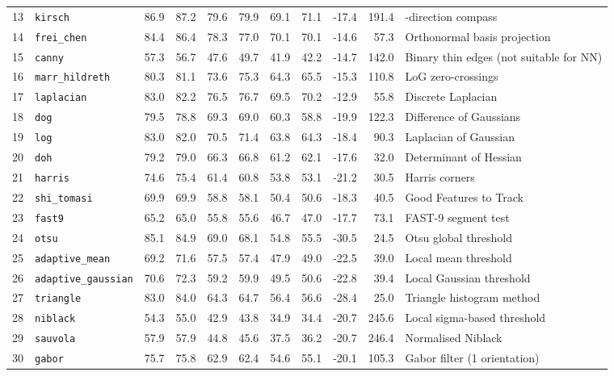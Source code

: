 \begin{landscape}
\begin{longtable}{@{}r >{\raggedright\arraybackslash\ttfamily}p{2.8cm} r r r r r r r r >{\raggedright\arraybackslash}p{3.4cm}@{}}
13 & \texttt{kirsch} & 86.9 & 87.2 & 79.6 & 79.9 & 69.1 & 71.1 & -17.4 & 191.4 & 8-direction compass \\
14 & \texttt{frei\_chen} & 84.4 & 86.4 & 78.3 & 77.0 & 70.1 & 70.1 & -14.6 & 57.3 & Orthonormal basis projection \\
15 & \texttt{canny} & 57.3 & 56.7 & 47.6 & 49.7 & 41.9 & 42.2 & -14.7 & 142.0 & Binary thin edges (not suitable for NN) \\
16 & \texttt{marr\_hildreth} & 80.3 & 81.1 & 73.6 & 75.3 & 64.3 & 65.5 & -15.3 & 110.8 & LoG zero-crossings \\
17 & \texttt{laplacian} & 83.0 & 82.2 & 76.5 & 76.7 & 69.5 & 70.2 & -12.9 & 55.8 & Discrete Laplacian \\
18 & \texttt{dog} & 79.5 & 78.8 & 69.3 & 69.0 & 60.3 & 58.8 & -19.9 & 122.3 & Difference of Gaussians \\
19 & \texttt{log} & 83.0 & 82.0 & 70.5 & 71.4 & 63.8 & 64.3 & -18.4 & 90.3 & Laplacian of Gaussian \\
20 & \texttt{doh} & 79.2 & 79.0 & 66.3 & 66.8 & 61.2 & 62.1 & -17.6 & 32.0 & Determinant of Hessian \\
21 & \texttt{harris} & 74.6 & 75.4 & 61.4 & 60.8 & 53.8 & 53.1 & -21.2 & 30.5 & Harris corners \\
22 & \texttt{shi\_tomasi} & 69.9 & 69.9 & 58.8 & 58.1 & 50.4 & 50.6 & -18.3 & 40.5 & Good Features to Track \\
23 & \texttt{fast9} & 65.2 & 65.0 & 55.8 & 55.6 & 46.7 & 47.0 & -17.7 & 73.1 & FAST-9 segment test \\
24 & \texttt{otsu} & 85.1 & 84.9 & 69.0 & 68.1 & 54.8 & 55.5 & -30.5 & 24.5 & Otsu global threshold \\
25 & \texttt{adaptive\_mean} & 69.2 & 71.6 & 57.5 & 57.4 & 47.9 & 49.0 & -22.5 & 39.0 & Local mean threshold \\
26 & \texttt{adaptive\_gaussian} & 70.6 & 72.3 & 59.2 & 59.9 & 49.5 & 50.6 & -22.8 & 39.4 & Local Gaussian threshold \\
27 & \texttt{triangle} & 83.0 & 84.0 & 64.3 & 64.7 & 56.4 & 56.6 & -28.4 & 25.0 & Triangle histogram method \\
28 & \texttt{niblack} & 54.3 & 55.0 & 42.9 & 43.8 & 34.9 & 34.4 & -20.7 & 245.6 & Local sigma-based threshold \\
29 & \texttt{sauvola} & 57.9 & 57.9 & 44.8 & 45.6 & 37.5 & 36.2 & -20.7 & 246.4 & Normalised Niblack \\
30 & \texttt{gabor} & 75.7 & 75.8 & 62.9 & 62.4 & 54.6 & 55.1 & -20.1 & 105.3 & Gabor filter (1 orientation) \\

\end{longtable}
\end{landscape}
